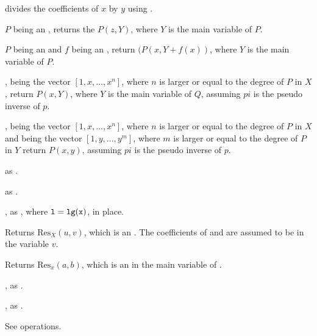 

 divides the coefficients of $x$
by $y$ using .

 $P$ being an , returns
the  $P(z,Y)$, where $Y$ is the main variable of $P$.

 $P$ being an  and $f$
being an , return $(P(x,Y+f(x))$, where $Y$ is the main variable of $P$.

, 
being the vector $[1,x,\dots,x^n]$, where $n$ is larger or equal to the degree
of $P$ in $X$, return $P(x,Y)$, where $Y$ is the main variable of $Q$, assuming
$pi$ is the pseudo inverse of $p$.

,
 being the vector $[1,x,\dots,x^n]$, where $n$ is larger or equal to the degree
of $P$ in $X$ and  being the vector $[1,y,\dots,y^m]$, where $m$ is larger or equal to the degree of $P$ in $Y$ return $P(x,y)$, assuming
$pi$ is the pseudo inverse of $p$.

 as .

 as .

, as , where
${\tt l} = {\tt lg(x)}$, in place.

 Returns
$\text{Res}_X(u, v)$, which is an . The coefficients of 
and  are assumed to be in the variable $v$.

Returns $\text{Res}_x(a, b)$, which is an 
in the main variable of .


, as .

, as
.

 See  operations.

